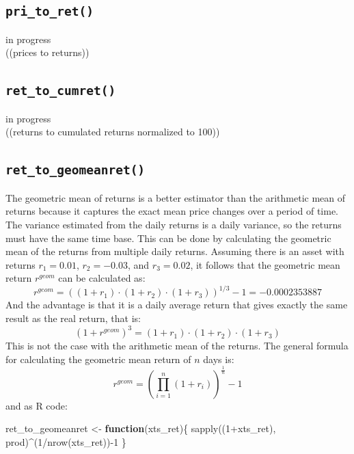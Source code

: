 \documentclass[
  oneside]{book}
\newenvironment{Shaded}{\begin{snugshade}}{\end{snugshade}}
\newcommand{\ControlFlowTok}[1]{\textcolor[rgb]{0.13,0.29,0.53}{\textbf{#1}}}
\newcommand{\DecValTok}[1]{\textcolor[rgb]{0.00,0.00,0.81}{#1}}
\newcommand{\FunctionTok}[1]{\textcolor[rgb]{0.00,0.00,0.00}{#1}}
\newcommand{\NormalTok}[1]{#1}
\newcommand{\OtherTok}[1]{\textcolor[rgb]{0.56,0.35,0.01}{#1}}
\newcommand{\SpecialCharTok}[1]{\textcolor[rgb]{0.00,0.00,0.00}{#1}}
\begin{document}
\hypertarget{pritoret}{%
\subsection{\texorpdfstring{\texttt{pri\_to\_ret()}}{pri\_to\_ret()}}\label{pritoret}}

\textbar\textbar\textbar in progress\textbar\textbar\textbar{}\\
((prices to returns))

\hypertarget{ret_to_cumret}{%
\subsection{\texorpdfstring{\texttt{ret\_to\_cumret()}}{ret\_to\_cumret()}}\label{ret_to_cumret}}

\textbar\textbar\textbar in progress\textbar\textbar\textbar{}\\
((returns to cumulated returns normalized to 100))

\hypertarget{geomeanret}{%
\subsection{\texorpdfstring{\texttt{ret\_to\_geomeanret()}}{ret\_to\_geomeanret()}}\label{geomeanret}}

The geometric mean of returns is a better estimator than the arithmetic mean of returns because it captures the exact mean price changes over a period of time. The variance estimated from the daily returns is a daily variance, so the returns must have the same time base. This can be done by calculating the geometric mean of the returns from multiple daily returns. Assuming there is an asset with returns \(r_1 = 0.01\), \(r_2=-0.03\), and \(r_3=0.02\), it follows that the geometric mean return \(r^{geom}\) can be calculated as:
\[
  r^{geom} = ((1+r_1) \cdot (1+r_2) \cdot (1+r_3))^{1/3}-1 = -0.0002353887
\]
And the advantage is that it is a daily average return that gives exactly the same result as the real return, that is:
\[
  (1+r^{geom})^3 = (1+r_1) \cdot (1+r_2) \cdot (1+r_3)
\]
This is not the case with the arithmetic mean of the returns. The general formula for calculating the geometric mean return of \(n\) days is:
\[
  r^{geom} = (\prod_{i=1}^n (1+r_i))^{\frac{1}{n}}-1
\]
and as R code:

\begin{Shaded}
\begin{Highlighting}[]
\NormalTok{ret\_to\_geomeanret }\OtherTok{\textless{}{-}} \ControlFlowTok{function}\NormalTok{(xts\_ret)\{}
  \FunctionTok{sapply}\NormalTok{((}\DecValTok{1}\SpecialCharTok{+}\NormalTok{xts\_ret), prod)}\SpecialCharTok{\^{}}\NormalTok{(}\DecValTok{1}\SpecialCharTok{/}\FunctionTok{nrow}\NormalTok{(xts\_ret))}\SpecialCharTok{{-}}\DecValTok{1}
\NormalTok{\}}
\end{Highlighting}
\end{Shaded}
\end{document}
